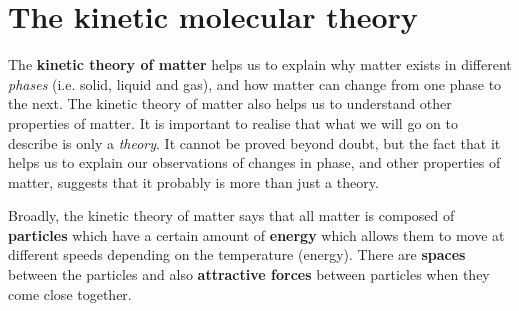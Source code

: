 % 
         \section{The kinetic molecular theory}
    \nopagebreak
      \label{m38730*id308618}The \textbf{kinetic theory of matter} helps us to explain why matter exists in different \textsl{phases} (i.e. solid, liquid and gas), and how matter can change from one phase to the next. The kinetic theory of matter also helps us to understand other properties of matter. It is important to realise that what we will go on to describe is only a \textsl{theory}. It cannot be proved beyond doubt, but the fact that it helps us to explain our observations of changes in phase, and other properties of matter, suggests that it probably is more than just a theory.
\par 
      \label{m38730*id308641}Broadly, the kinetic theory of matter says that all matter is composed of \textbf{particles} which have a certain amount of \textbf{energy} which allows them to move at different speeds depending on the temperature (energy). There are \textbf{spaces} between the particles and also \textbf{attractive forces} between particles when they come close together.

